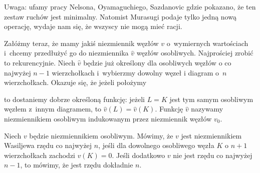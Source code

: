 Uwaga: ufamy pracy Nelsona, Oyamaguchiego, Sazdanovic \cite{sazdanovic19} gdzie pokazano, że ten zestaw ruchów jest minimalny.
%
%
%
Natomist Murasugi podaje tylko jedną nową operację, wydaje nam się, że wszyscy nie mogą mieć racji.

Załóżmy teraz, że mamy jakiś niezmiennik węzłów $v$ o~wymiernych wartościach i~chcemy przedłużyć go do niezmiennika $\hat v$ węzłów osobliwych.
Najprościej zrobić to rekurencyjnie.
Niech $\hat v$ będzie już określony dla osobliwych węzłów o co najwyżej $n - 1$ wierzchołkach i~wybierzmy dowolny węzeł i diagram o~$n$ wierzchołkach.
Okazuje się, że jeżeli położymy

to dostaniemy dobrze określoną funkcję: jeżeli $L = K$ jest tym samym osobliwym węzłem z~innym diagramem, to $\hat v(L) = \hat v(K)$.
Funkcję $\hat v$ nazywamy niezmiennikiem osobliwym indukowanym przez niezmiennik węzłów $v_0$.

\begin{definition}
\label{def:vassiliev_order}%
%
    Niech $v$ będzie niezmiennikiem osobliwym.
    Mówimy, że $v$ jest niezmiennikiem Wasiljewa rzędu co najwyżej $n$, jeśli dla dowolnego osobliwego węzła $K$ o $n + 1$ wierzchołkach zachodzi $v(K) = 0$.
    Jeśli dodatkowo $v$ nie jest rzędu co najwyżej $n - 1$, to mówimy, że jest rzędu dokładnie $n$.
\end{definition}

